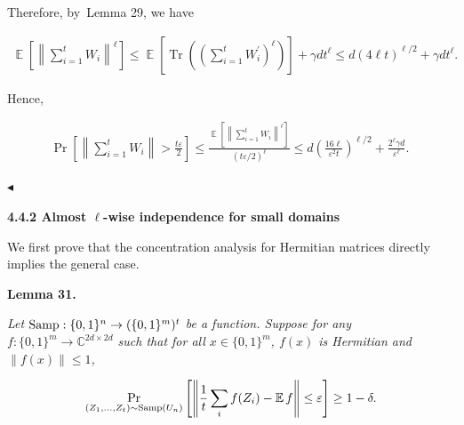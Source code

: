 Therefore, by Lemma 29, we have\par


\[\begin{gathered}
\operatorname*{\mathbb{E}}\left[\left\lVert\sum_{i=1}^{t}W_{i}\right\rVert^{\ell}\right]\leq\operatorname*{\mathbb{E}}\left[\operatorname*{Tr}\left(\left(\sum_{i=1}^{t}W_{i}^{\prime}\right)^{\ell}\right)\right]+\gamma dt^{\ell}\leq d\left(4\ell t\right)^{{\ell}/{2}}+\gamma dt^{\ell}.
\end{gathered}\]


Hence,\par


\[\begin{gathered}
\Pr\left[\left\lVert\sum_{i=1}^{t}W_{i}\right\rVert>\frac{t\varepsilon}{2}\right]\leq\frac{\operatorname*{\mathbb{E}}\left[\left\lVert\sum_{i=1}^{t}W_{i}\right\rVert^{\ell}\right]}{(t\varepsilon/2)^{\ell}}\leq d\left(\frac{16\ell}{\varepsilon^{2}t}\right)^{\ell/2}+\frac{2^{\ell}\gamma d}{\varepsilon^{\ell}}.\
\end{gathered}\]


$\blacktriangleleft$\par






\par\medskip\noindent\textbf{
4.4.2 Almost $\ell$-wise independence for small domains}\par




We first prove that the concentration analysis for Hermitian matrices directly implies the general case.\par





\par\medskip\noindent\textbf{
\textbf{Lemma 31}\textbf{.}
}\par



\emph{Let $\textup{{Samp}}:\{0,1\}^{n}\to(\{0,1\}^{m})^{t}$ be a function. Suppose for any $f:\{0,1\}^{m}\to\mathbb{C}^{2d\times 2d}$ such that for all $x\in\{0,1\}^{m}$, $f(x)$ is Hermitian and $\|f(x)\|\leq 1$,}\par


\[\begin{gathered}
\Pr_{(Z_{1},\dots,Z_{t})\sim\textup{{Samp}}(U_{n})}\left[\left\lVert\frac{1}{t}\sum_{i}f(Z_{i})-\operatorname*{\mathbb{E}}f\right\rVert\leq\varepsilon\right]\geq 1-\delta.
\end{gathered}\]


